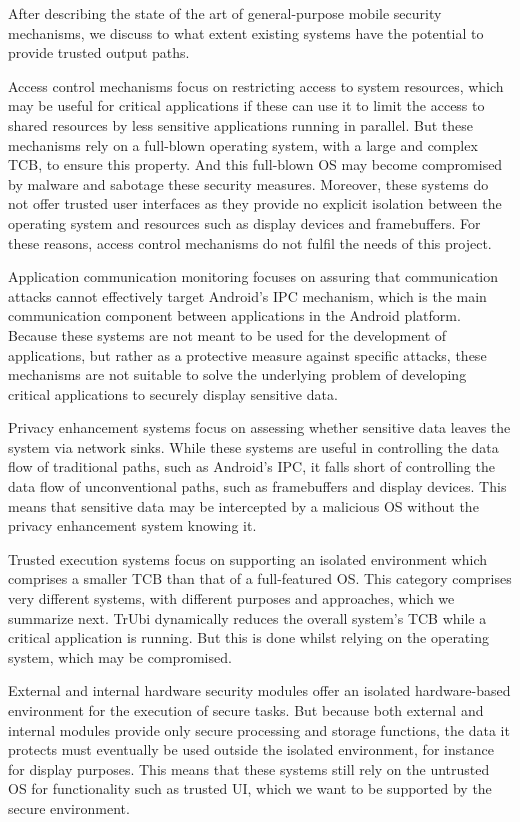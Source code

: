 After describing the state of the art of general-purpose mobile security mechanisms, we discuss to what extent existing systems have the potential to provide trusted output paths.

Access control mechanisms focus on restricting access to system resources, which may be useful for critical applications if these can use it to limit the access to shared resources by less sensitive applications running in parallel. But these mechanisms rely on a full-blown operating system, with a large and complex TCB, to ensure this property. And this full-blown OS may become compromised by malware and sabotage these security measures. Moreover, these systems do not offer trusted user interfaces as they provide no explicit isolation between the operating system and resources such as display devices and framebuffers. For these reasons, access control mechanisms do not fulfil the needs of this project.

Application communication monitoring focuses on assuring that communication attacks cannot effectively target Android's IPC mechanism, which is the main communication component between applications in the Android platform. Because these systems are not meant to be used for the development of applications, but rather as a protective measure against specific attacks, these mechanisms are not suitable to solve the underlying problem of developing critical applications to securely display sensitive data.

Privacy enhancement systems focus on assessing whether sensitive data leaves the system via network sinks. While these systems are useful in controlling the data flow of traditional paths, such as Android's IPC, it falls short of controlling the data flow of unconventional paths, such as framebuffers and display devices. This means that sensitive data may be intercepted by a malicious OS without the privacy enhancement system knowing it.

Trusted execution systems focus on supporting an isolated environment which comprises a smaller TCB than that of a full-featured OS. This category comprises very different systems, with different purposes and approaches, which we summarize next. TrUbi dynamically reduces the overall system's TCB while a critical application is running. But this is done whilst relying on the operating system, which may be compromised.

External and internal hardware security modules offer an isolated hardware-based environment for the execution of secure tasks. But because both external and internal modules provide only secure processing and storage functions, the data it protects must eventually be used outside the isolated environment, for instance for display purposes. This means that these systems still rely on the untrusted OS for functionality such as trusted UI, which we want to be supported by the secure environment.

